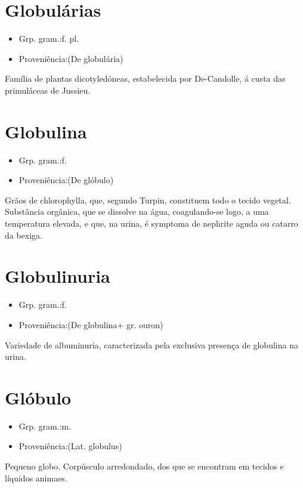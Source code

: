 \section{Globulárias}
\begin{itemize}
\item {Grp. gram.:f. pl.}
\end{itemize}
\begin{itemize}
\item {Proveniência:(De \textunderscore globulária\textunderscore )}
\end{itemize}
Família de plantas dicotyledóneas, estabelecida por De-Candolle, á custa das primuláceas de Jussieu.
\section{Globulina}
\begin{itemize}
\item {Grp. gram.:f.}
\end{itemize}
\begin{itemize}
\item {Proveniência:(De \textunderscore glóbulo\textunderscore )}
\end{itemize}
Grãos de chlorophylla, que, segundo Turpin, constituem todo o tecido vegetal.
Substância orgânica, que se dissolve na água, coagulando-se logo, a uma temperatura elevada, e que, na urina, é symptoma de nephrite aguda ou catarro da bexiga.
\section{Globulinuria}
\begin{itemize}
\item {Grp. gram.:f.}
\end{itemize}
\begin{itemize}
\item {Proveniência:(De \textunderscore globulina\textunderscore  + gr. \textunderscore ouron\textunderscore )}
\end{itemize}
Variedade de albuminuria, caracterizada pela exclusiva presença de globulina na urina.
\section{Glóbulo}
\begin{itemize}
\item {Grp. gram.:m.}
\end{itemize}
\begin{itemize}
\item {Proveniência:(Lat. \textunderscore globulus\textunderscore )}
\end{itemize}
Pequeno globo.
Corpúsculo arredondado, dos que se encontram em tecidos e líquidos animaes.
